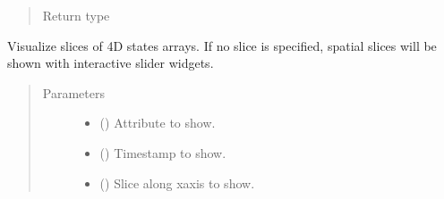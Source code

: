 \documentclass[letterpaper,10pt,english]{sphinxmanual}
\begin{document}
\begin{fulllineitems}
\begin{fulllineitems}
\begin{quote}
\begin{description}
\item[{Return type}] \leavevmode
{\hyperref[\detokenize{api/base_classes:geology.src.base_spatial.SpatialComponent}]{}}

\end{description}\end{quote}

\end{fulllineitems}


\begin{fulllineitems}
\label{\detokenize{api/states:geology.src.States.show_cube}}
Visualize slices of 4D states arrays. If no slice is specified, spatial slices
will be shown with interactive slider widgets.
\begin{quote}\begin{description}
\item[{Parameters}] \leavevmode\begin{itemize}
\item {} 
 () \textendash{} Attribute to show.

\item {} 
 (\sphinxstyleliteralemphasis{\sphinxupquote{, }}) \textendash{} Timestamp to show.

\item {} 
 (\sphinxstyleliteralemphasis{\sphinxupquote{, }}) \textendash{} Slice along x\sphinxhyphen{}axis to show.


\end{itemize}
\end{description}
\end{quote}
\end{fulllineitems}
\end{fulllineitems}
\end{document}
